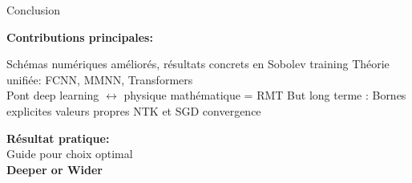 \documentclass{beamer}
\begin{document}
\begin{frame}{Conclusion}
\begin{center}
\textbf{Contributions principales:}

\vspace{0.5cm}


Schémas numériques améliorés, résultats concrets en Sobolev training
Théorie unifiée: FCNN, MMNN, Transformers\\
Pont deep learning $\leftrightarrow$ physique mathématique = RMT
But long terme : Bornes explicites valeurs propres NTK et SGD convergence\\
\vspace{1cm}

\textbf{Résultat pratique:}\\
Guide pour choix optimal\\
\textbf{Deeper or Wider}
\end{center}
\end{frame}
\end{document}
